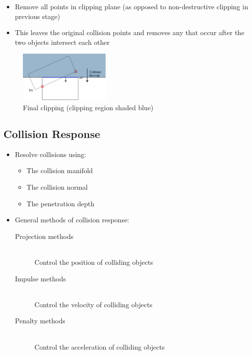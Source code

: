 \documentclass[a4paper]{article}
\begin{document}
\begin{enumerate}
\begin{itemize}
      \item
        Remove all points in clipping plane (as opposed to non-destructive
        clipping in previous stage)

      \item
        This leaves the original collision points and removes any that occur
        after the two objects intersect each other

    \end{itemize}

    \begin{figure}[h!]
      \centering
      \includegraphics[width=0.4\textwidth]{graphics/manifolds_clipping_4.eps}
      \caption{Final clipping (clipping region shaded blue)}
      \label{fig:manifolds_clipping_4}
    \end{figure}
    \FloatBarrier

\end{enumerate}

\subsection{Collision Response}

\begin{itemize}
  \item
    Resolve collisions using:
    \begin{itemize}
      \item
        The collision manifold

      \item
        The collision normal

      \item
        The penetration depth

    \end{itemize}

  \item
    General methods of collision response:
    \begin{description}
      \item[Projection methods] \hfill \\
        Control the position of colliding objects

      \item[Impulse methods] \hfill \\
        Control the velocity of colliding objects

      \item[Penalty methods] \hfill \\
        Control the acceleration of colliding objects

    \end{description}

\end{itemize}
\end{document}
